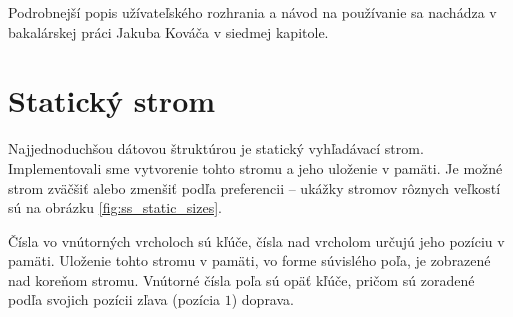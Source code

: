 Podrobnejší popis užívateľského rozhrania a návod na používanie sa nachádza v bakalárskej práci Jakuba Kováča \citep{algviskuko} v siedmej kapitole.

\section{Statický strom}
Najjednoduchšou dátovou štruktúrou je statický vyhľadávací strom. Implementovali sme vytvorenie tohto stromu a jeho uloženie v pamäti. Je možné strom zväčšiť alebo zmenšiť podľa preferencii -- ukážky stromov rôznych veľkostí sú na obrázku \ref{fig:ss_static_sizes}.

Čísla vo vnútorných vrcholoch sú kľúče, čísla nad vrcholom určujú jeho pozíciu v pamäti. Uloženie tohto stromu v pamäti, vo forme súvislého poľa, je zobrazené nad koreňom stromu. Vnútorné čísla poľa sú opäť kľúče, pričom sú zoradené podľa svojich pozícii zľava (pozícia $1$) doprava.

